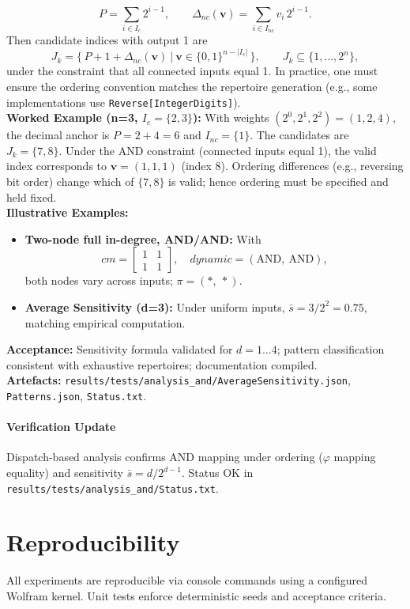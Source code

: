 \documentclass{article}
\begin{document}
\[
P=\sum_{i\in I_c}2^{i-1},\qquad \Delta_{nc}(\mathbf{v})=\sum_{i\in I_{nc}} v_i\,2^{i-1}.
\]
Then candidate indices with output 1 are
\[
J_k=\big\{\,P+1+\Delta_{nc}(\mathbf{v})\ \big|\ \mathbf{v}\in\{0,1\}^{n-\lvert I_c\rvert}\,\big\},\qquad J_k\subseteq\{1,\dots,2^n\},
\]
under the constraint that all connected inputs equal 1. In practice, one must ensure the ordering convention matches the repertoire generation (e.g., some implementations use \texttt{Reverse[IntegerDigits]}).\\
\textbf{Worked Example (n=3, \(I_c=\{2,3\}\)):} With weights \((2^{0},2^{1},2^{2})=(1,2,4)\), the decimal anchor is \(P=2+4=6\) and \(I_{nc}=\{1\}\). The candidates are \(J_k=\{7,8\}\). Under the AND constraint (connected inputs equal 1), the valid index corresponds to \(\mathbf{v}=(1,1,1)\) (index 8). Ordering differences (e.g., reversing bit order) change which of \(\{7,8\}\) is valid; hence ordering must be specified and held fixed.\\
\textbf{Illustrative Examples:}
\begin{itemize}
\item \textbf{Two-node full in-degree, AND/AND:} With
\[
cm = \begin{bmatrix}1 & 1\\ 1 & 1\end{bmatrix},\quad dynamic=(\text{AND},\ \text{AND}),
\]
both nodes vary across inputs; \(\pi=(*,\ *)\).
\item \textbf{Average Sensitivity (d=3):} Under uniform inputs, \(\bar{s}=3/2^{2}=0.75\), matching empirical computation.
\end{itemize}
\textbf{Acceptance:} Sensitivity formula validated for \(d=1\dots 4\); pattern classification consistent with exhaustive repertoires; documentation compiled.\\
\textbf{Artefacts:} \texttt{results/tests/analysis\_and/AverageSensitivity.json}, \texttt{Patterns.json}, \texttt{Status.txt}.
\paragraph{Verification Update} Dispatch-based analysis confirms AND mapping under ordering (\(\varphi\) mapping equality) and sensitivity \(\bar{s}=d/2^{d-1}\). Status OK in \texttt{results/tests/analysis\_and/Status.txt}.


\section{Reproducibility}
All experiments are reproducible via console commands using a configured Wolfram kernel. Unit tests enforce deterministic seeds and acceptance criteria.
\end{document}
